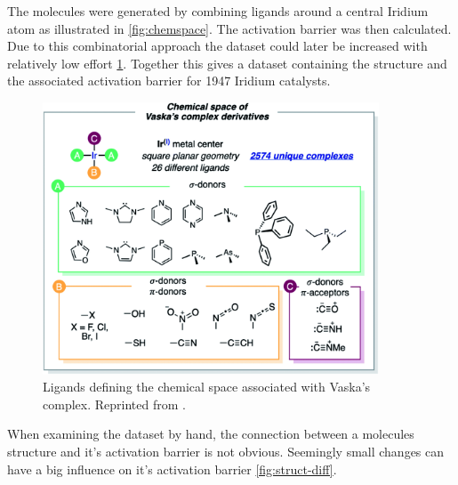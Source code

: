 The molecules were generated by combining ligands around a central Iridium atom as illustrated in \autoref{fig:chemspace}.
The activation barrier was then calculated.
Due to this combinatorial approach the dataset could later be increased with relatively low effort \ref{fig:chemspace}.
Together this gives a dataset containing the structure and the associated activation barrier for 1947 Iridium catalysts.

\begin{figure}
  \centering
  \includegraphics[width=10cm]{figures/introduction/chem-space.png}
  \caption{Ligands defining the chemical space associated with Vaska's complex. Reprinted from \cite{friederich_dos}.}
  \label{fig:chemspace}
\end{figure}

When examining the dataset by hand, the connection between a molecules structure and it's activation barrier is not obvious.
Seemingly small changes can have a big influence on it's activation barrier \ref{fig:struct-diff}.

